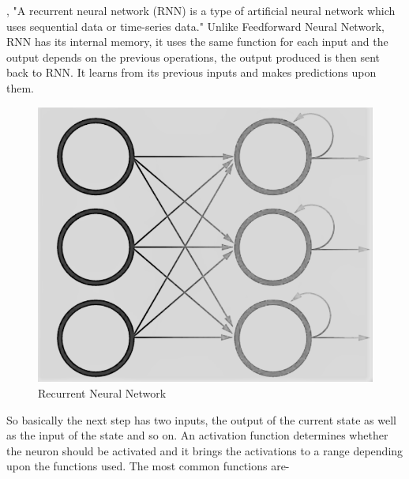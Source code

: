 \documentclass[oneside,12pt]{Classes/RoboticsLaTeX}
\begin{document}
\cite{ibm}, "A recurrent neural network (RNN) is a type of artificial neural network which uses sequential data or time-series data." Unlike Feedforward Neural Network, RNN has its internal memory, it uses the same function for each input and the output depends on the previous operations, the output produced is then sent back to RNN. It learns from its previous inputs and makes predictions upon them.
\begin{figure}[H]
  \centering
  \includegraphics[width=0.5\linewidth]{Figures/rnn.png}
  \caption{Recurrent Neural Network}
  \label{fig:rnn}
\end{figure}
So basically the next step has two inputs, the output of the current state as well as the input of the state and so on. An activation function determines whether the neuron should be activated and it brings the activations to a range depending upon the functions used. The most common functions are-
\end{document}
